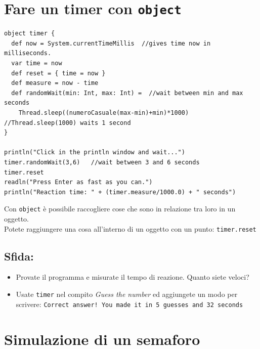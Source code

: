 \chapter{Fare un timer con \lstinline{object}}
\begin{lstlisting}[basicstyle={\ttfamily\fontsize{14}{17}\selectfont},numbers=none]
object timer {
  def now = System.currentTimeMillis  //gives time now in milliseconds.
  var time = now
  def reset = { time = now }
  def measure = now - time
  def randomWait(min: Int, max: Int) =  //wait between min and max seconds
    Thread.sleep((numeroCasuale(max-min)+min)*1000)  //Thread.sleep(1000) waits 1 second
}

println("Click in the println window and wait...")
timer.randomWait(3,6)   //wait between 3 and 6 seconds
timer.reset
readln("Press Enter as fast as you can.")
println("Reaction time: " + (timer.measure/1000.0) + " seconds")
\end{lstlisting}
        
Con \lstinline{object} è possibile raccogliere cose che sono in relazione tra loro in un oggetto.\\
Potete raggiungere una cosa all'interno di un oggetto con un punto: \lstinline{timer.reset}
\section*{\color{BrickRed}Sfida:}


\begin{itemize}

\item {Provate il programma e misurate il tempo di reazione. Quanto siete veloci?}
\item {Usate \lstinline{timer} nel compito {\it Guess the number} ed aggiungete un modo per scrivere: \lstinline{Correct answer! You made it in 5 guesses and 32 seconds}}

\end{itemize}


\chapter{Simulazione di un semaforo}
  

